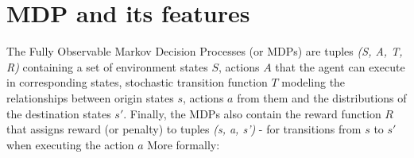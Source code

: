 




\section{MDP and its features}

The Fully Observable Markov Decision Processes (or MDPs) are tuples \emph{(S, A, T, R)} containing a set of environment states $S$, actions $A$ that the agent can execute in corresponding states, stochastic transition function $T$ modeling the relationships between origin states $s$, actions $a$ from them and the distributions of the destination states $s'$. Finally, the MDPs also contain the reward function $R$ that assigns reward (or penalty) to tuples \emph{(s, a, s')} - for transitions from $s$ to $s'$ when executing the action $a$ More formally:


